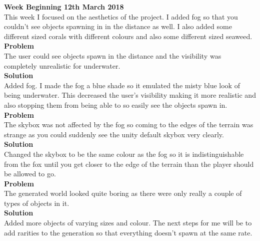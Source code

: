 \documentclass[10pt, a4paper]{article}
\begin{document}
	\textbf{Week Beginning 12th March 2018}\\
	This week I focused on the aesthetics of the project. I added fog so that you couldn't see objects
	spawning in in the distance as well. I also added some different sized corals with different colours
	and also some different sized seaweed.\\
	\textbf{Problem}\\
	The user could see objects spawn in the distance and the visibility was completely unrealistic for
	underwater.\\
	\textbf{Solution}\\
	Added fog. I made the fog a blue shade so it emulated the misty blue look of being underwater. This
	decreased the user's visibility making it more realistic and also stopping them from being able to so
	easily see the objects spawn in.\\
	\textbf{Problem}\\
	The skybox was not affected by the fog so coming to the edges of the terrain was strange as you
	could suddenly see the unity default skybox very clearly.\\
	\textbf{Solution}\\
	Changed the skybox to be the same colour as the fog so it is indistinguishable from the fox until you
	get closer to the edge of the terrain than the player should be allowed to go.\\
	\textbf{Problem}\\
	The generated world looked quite boring as there were only really a couple of types of objects in it.\\
	\textbf{Solution}\\
	Added more objects of varying sizes and colour.
	The next steps for me will be to add rarities to the generation so that everything doesn't spawn at
	the same rate.\\\\
	
\end{document}
